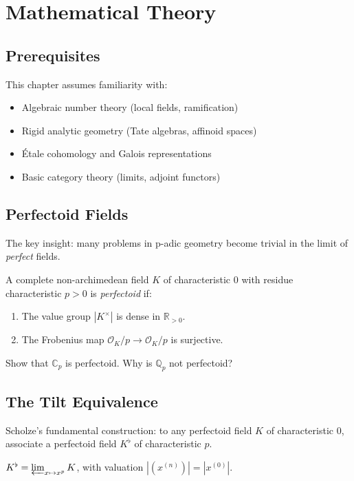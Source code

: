 \section{Mathematical Theory}


\subsection{Prerequisites}
This chapter assumes familiarity with:
\begin{itemize}
\item Algebraic number theory (local fields, ramification)
\item Rigid analytic geometry (Tate algebras, affinoid spaces)
\item \'Etale cohomology and Galois representations
\item Basic category theory (limits, adjoint functors)
\end{itemize}

\subsection{Perfectoid Fields}
The key insight: many problems in p-adic geometry become trivial in the limit of \emph{perfect} fields.

\begin{definition}
A complete non-archimedean field $K$ of characteristic $0$ with residue characteristic $p>0$ is \emph{perfectoid} if:
\begin{enumerate}
\item The value group $|K^\times|$ is dense in $\mathbb{R}_{>0}$.
\item The Frobenius map $\mathcal{O}_K/p \to \mathcal{O}_K/p$ is surjective.
\end{enumerate}
\end{definition}

\begin{exercise}[Basic]
Show that $\mathbb{C}_p$ is perfectoid. Why is $\mathbb{Q}_p$ not perfectoid?
\end{exercise}

\subsection{The Tilt Equivalence}
Scholze's fundamental construction: to any perfectoid field $K$ of characteristic $0$, associate a perfectoid field $K^\flat$ of characteristic $p$.

\begin{definition}[Tilt]
$K^\flat = \varprojlim_{x \mapsto x^p} K$, with valuation $|(x^{(n)})| = |x^{(0)}|$.
\end{definition}

